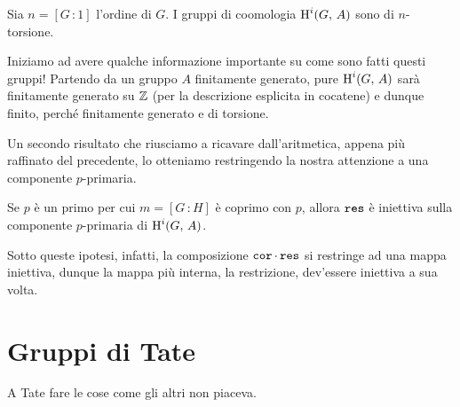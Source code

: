 \begin{corollary}
	Sia $ n = [G 	\,\colon 1] $ l'ordine di $ G $. I gruppi di coomologia $ \operatorname{H}^i(G, \, A) $ sono di $ n $-torsione.
\end{corollary}

Iniziamo ad avere qualche informazione importante su come sono fatti questi gruppi! Partendo da un gruppo $ A $ finitamente generato, pure $ \operatorname{H}^i(G, \, A) $ sarà finitamente generato su $ \mathbb{Z} $ (per la descrizione esplicita in cocatene) e dunque finito, perché finitamente generato e di torsione.

Un secondo risultato che riusciamo a ricavare dall'aritmetica, appena più raffinato del precedente, lo otteniamo restringendo la nostra attenzione a una componente $ p $-primaria.

\begin{lemma}
	Se $ p $ è un primo per cui $ m = [G \, \colon H] $ è coprimo con $ p $, allora $ \operatorname{\texttt{res}} $ è iniettiva sulla componente $ p $-primaria di $ \operatorname{H}^i(G, \, A) $.
\end{lemma}

Sotto queste ipotesi, infatti, la composizione $ \operatorname{\texttt{cor}} \cdot \operatorname{\texttt{res}} $ si restringe ad una mappa iniettiva, dunque la mappa più interna, la restrizione, dev'essere iniettiva a sua volta.

\section{Gruppi di Tate}

A Tate fare le cose come gli altri non piaceva.
